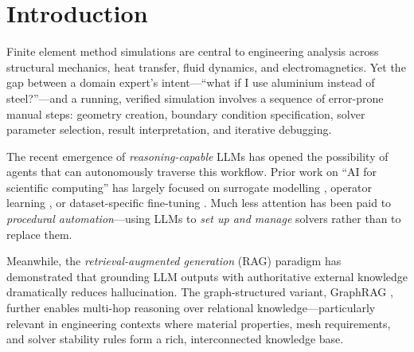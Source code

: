 \documentclass[twocolumn]{article}
\begin{document}
\section{Introduction}
\label{sec:intro}

Finite element method simulations are central to engineering analysis across
structural mechanics, heat transfer, fluid dynamics, and electromagnetics.
Yet the gap between a domain expert's intent—``what if I use aluminium instead
of steel?''—and a running, verified simulation involves a sequence of error-prone
manual steps: geometry creation, boundary condition specification, solver
parameter selection, result interpretation, and iterative debugging.

The recent emergence of \emph{reasoning-capable} LLMs \citep{brown2020gpt3,
wei2022cot, yao2023react} has opened the possibility of agents that can
autonomously traverse this workflow.  Prior work on ``AI for scientific
computing'' has largely focused on surrogate modelling
\citep{lagaris1998neural, raissi2019pinn, karniadakis2021physics}, operator
learning \citep{li2021fno}, or dataset-specific fine-tuning
\citep{jumper2021alphafold}.  Much less attention has been paid to
\emph{procedural automation}—using LLMs to \emph{set up and manage} solvers
rather than to replace them.

Meanwhile, the \emph{retrieval-augmented generation} (RAG) paradigm
\citep{lewis2020rag} has demonstrated that grounding LLM outputs with
authoritative external knowledge dramatically reduces hallucination.  The
graph-structured variant, GraphRAG \citep{edge2024graphrag}, further enables
multi-hop reasoning over relational knowledge—particularly relevant in
engineering contexts where material properties, mesh requirements, and solver
stability rules form a rich, interconnected knowledge base.
\end{document}
